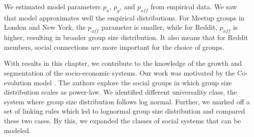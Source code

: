 We estimated model parameters $p_a$, $p_g$, and $p_{aff}$ from empirical data. We saw that model approximates well the empirical distributions. For Meetup groups in London and New York, the $p_{aff}$ parameter is smaller, while for Reddit, $p_{aff}$ is higher, resulting in broader group size distribution. It also means that for Reddit members, social connections are more important for the choice of groups. %

With results in this chapter, we contribute to the knowledge of the growth and segmentation of the socio-economic systems. Our work was motivated by the Co-evolution model \cite{zheleva2009co}. The authors explore the social groups in which group size distribution scales as power-law. We identified different universality class, the system where group size distribution follows log normal. Further, we marked off a set of linking rules which led to lognormal group size distribution and compared these two cases. By this, we expanded the classes of social systems that can be modeled.  









